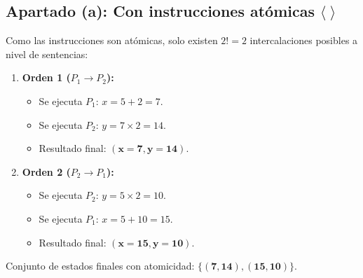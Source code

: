 \documentclass[11pt,a4paper,twoside,openright]{report}
\begin{document}
\begin{solucion}
\subsection*{Apartado (a): Con instrucciones atómicas $\langle \; \rangle$}
Como las instrucciones son atómicas, solo existen $2! = 2$ intercalaciones posibles a nivel de sentencias:

\begin{enumerate}[leftmargin=*]
    \item \textbf{Orden 1 ($P_1 \to P_2$):}
    \begin{itemize}
        \item Se ejecuta $P_1$: $x = 5 + 2 = 7$.
        \item Se ejecuta $P_2$: $y = 7 \times 2 = 14$.
        \item Resultado final: $\mathbf{(x = 7, y = 14)}$.
    \end{itemize}
    \item \textbf{Orden 2 ($P_2 \to P_1$):}
    \begin{itemize}
        \item Se ejecuta $P_2$: $y = 5 \times 2 = 10$.
        \item Se ejecuta $P_1$: $x = 5 + 10 = 15$.
        \item Resultado final: $\mathbf{(x = 15, y = 10)}$.
    \end{itemize}
\end{enumerate}
Conjunto de estados finales con atomicidad: $\mathbf{\{(7, 14), (15, 10)\}}$.


\end{solucion}
\end{document}
